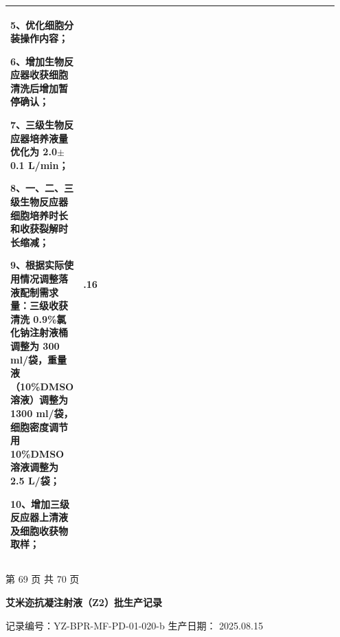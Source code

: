 \documentclass[UTF8,10pt,a4paper,fontset=fandol]{ctexart}
\newcommand{\fieldvalue}[1]{#1}
\begin{document}
\begin{tabular}{|p{0.12\linewidth}|p{0.68\linewidth}|p{0.15\linewidth}|}
{{5、优化细胞分装操作内容；\par
6、增加生物反应器收获细胞清洗后增加暂停确认；\par
7、三级生物反应器培养液量优化为 2.0$\pm$0.1 L/min；\par
8、一、二、三级生物反应器细胞培养时长和收获裂解时长缩减；\par
9、根据实际使用情况调整落液配制需求量：三级收获清洗 0.9\%氯化钠注射液桶调整为 300 ml/袋，重量液（10\%DMSO 溶液）调整为 1300 ml/袋，细胞密度调节用 10\%DMSO 溶液调整为 2.5 L/袋；\par
10、增加三级反应器上清液及细胞收获物取样；
}}
&
\centering \fieldvalue{2025.05.16}
\tabularnewline
\hline
\end{tabular}

\normalsize

\begin{center}
第 69 页 共 70 页
\end{center}

\newpage

\begin{center}
\textbf{艾米迩抗凝注射液（Z2）批生产记录}
\end{center}

\noindent
记录编号：YZ-BPR-MF-PD-01-020-b
\hfill
生产日期：
\fieldvalue{2025.08.15}

\vspace{0.5em}
\end{document}
